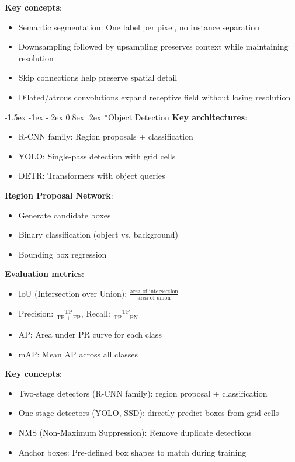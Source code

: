\documentclass{article}
\makeatletter
\renewcommand\section{\@startsection{section}{1}{\z@}%
                                  {-1.5ex \@plus -1ex \@minus -.2ex}%
                                  {0.8ex \@plus.2ex}%
                                  {\normalfont\small\bfseries}}
\makeatother
\begin{document}
\begin{multicols}{3}
\textbf{Key concepts}:
\begin{itemize}
\item Semantic segmentation: One label per pixel, no instance separation
\item Downsampling followed by upsampling preserves context while maintaining resolution
\item Skip connections help preserve spatial detail
\item Dilated/atrous convolutions expand receptive field without losing resolution
\end{itemize}

\section*{\underline{Object Detection}}
\textbf{Key architectures}:
\begin{itemize}
\item R-CNN family: Region proposals + classification
\item YOLO: Single-pass detection with grid cells
\item DETR: Transformers with object queries
\end{itemize}

\textbf{Region Proposal Network}:
\begin{itemize}
\item Generate candidate boxes
\item Binary classification (object vs. background)
\item Bounding box regression
\end{itemize}

\textbf{Evaluation metrics}:
\begin{itemize}
\item IoU (Intersection over Union): $\frac{\text{area of intersection}}{\text{area of union}}$
\item Precision: $\frac{\text{TP}}{\text{TP + FP}}$, Recall: $\frac{\text{TP}}{\text{TP + FN}}$
\item AP: Area under PR curve for each class
\item mAP: Mean AP across all classes
\end{itemize}

\textbf{Key concepts}:
\begin{itemize}
\item Two-stage detectors (R-CNN family): region proposal + classification
\item One-stage detectors (YOLO, SSD): directly predict boxes from grid cells
\item NMS (Non-Maximum Suppression): Remove duplicate detections
\item Anchor boxes: Pre-defined box shapes to match during training
\end{itemize}


\end{multicols}
\end{document}
